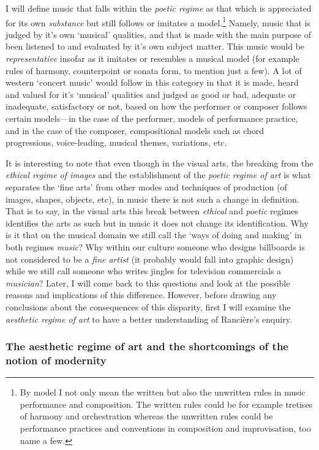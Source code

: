 I will define music that falls within the \emph{poetic regime} as that which is appreciated for its own \emph{substance} but still follows or imitates a model.\footnote{By model I not only mean the written but also the unwritten rules in music performance and composition. The written rules could be for example tretises of harmony and orchestration whereas the unwritten rules could be performance practices and conventions in composition and improvisation, too name a few.} Namely, music that is judged by it's own `musical' qualities, and that is made with the main purpose of been listened to and evaluated by it's own subject matter. This music would be \emph{representative} insofar as it imitates or resembles a musical model (for example rules of harmony, counterpoint or sonata form, to mention just a few). A lot of western `concert music' would follow in this category in that it is made, heard and valued for it's `musical' qualities and judged as good or bad, adequate or inadequate, satisfactory or not, based on how the performer or composer follows certain models---in the case of the performer, models of performance practice, and in the case of the composer, compositional models such as chord progressions, \mbox{voice-leading}, musical themes, variations, etc. 

It is interesting to note that even though in the visual arts, the breaking from the \emph{ethical regime of images} and the establishment of the \emph{poetic regime of art} is what separates the `fine arts' from other modes and techniques of production (of images, shapes, objects, etc), in music there is not such a change in definition. That is to say, in the visual arts this break between \emph{ethical} and \emph{poetic} regimes identifies the arts as such but in music it does not change its identification. Why is it that on the musical domain we still call the `ways of doing and making' in both regimes \emph{music}? Why within our culture someone who designs billboards is not considered to be a \emph{fine artist} (it probably would fall into graphic design) while we still call someone who writes jingles for television commercials a \emph{musician}? Later, I will come back to this questions and look at the possible reasons and implications of this difference. However, before drawing any conclusions about the consequences of this disparity, first I will examine the \emph{aesthetic regime of art} to have a better understanding of Ranci\`{e}re's enquiry.

\subsubsection{The aesthetic regime of art and the shortcomings of the notion of modernity}

